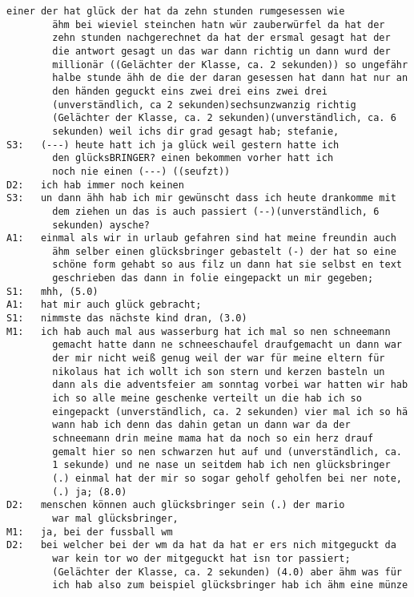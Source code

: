 \begin{lstlisting}[language={}]
        einer der hat glück der hat da zehn stunden rumgesessen wie 
        ähm bei wieviel steinchen hatn wür zauberwürfel da hat der 
        zehn stunden nachgerechnet da hat der ersmal gesagt hat der 
        die antwort gesagt un das war dann richtig un dann wurd der 
        millionär ((Gelächter der Klasse, ca. 2 sekunden)) so ungefähr 
        halbe stunde ähh de die der daran gesessen hat dann hat nur an  
        den händen geguckt eins zwei drei eins zwei drei 
        (unverständlich, ca 2 sekunden)sechsunzwanzig richtig 
        (Gelächter der Klasse, ca. 2 sekunden)(unverständlich, ca. 6 
        sekunden) weil ichs dir grad gesagt hab; stefanie,
S3:   (---) heute hatt ich ja glück weil gestern hatte ich                
        den glücksBRINGER? einen bekommen vorher hatt ich
        noch nie einen (---) ((seufzt))
D2:   ich hab immer noch keinen
S3:   un dann ähh hab ich mir gewünscht dass ich heute drankomme mit  
        dem ziehen un das is auch passiert (--)(unverständlich, 6 
        sekunden) aysche?
A1:   einmal als wir in urlaub gefahren sind hat meine freundin auch 
        ähm selber einen glücksbringer gebastelt (-) der hat so eine 
        schöne form gehabt so aus filz un dann hat sie selbst en text 
        geschrieben das dann in folie eingepackt un mir gegeben;
S1:   mhh, (5.0) 
A1:   hat mir auch glück gebracht;
S1:   nimmste das nächste kind dran, (3.0)
M1:   ich hab auch mal aus wasserburg hat ich mal so nen schneemann 
        gemacht hatte dann ne schneeschaufel draufgemacht un dann war 
        der mir nicht weiß genug weil der war für meine eltern für 
        nikolaus hat ich wollt ich son stern und kerzen basteln un 
        dann als die adventsfeier am sonntag vorbei war hatten wir hab 
        ich so alle meine geschenke verteilt un die hab ich so 
        eingepackt (unverständlich, ca. 2 sekunden) vier mal ich so hä  
        wann hab ich denn das dahin getan un dann war da der 
        schneemann drin meine mama hat da noch so ein herz drauf 
        gemalt hier so nen schwarzen hut auf und (unverständlich, ca. 
        1 sekunde) und ne nase un seitdem hab ich nen glücksbringer 
        (.) einmal hat der mir so sogar geholf geholfen bei ner note, 
        (.) ja; (8.0)
D2:   menschen können auch glücksbringer sein (.) der mario 
        war mal glücksbringer,
M1:   ja, bei der fussball wm
D2:   bei welcher bei der wm da hat da hat er ers nich mitgeguckt da 
        war kein tor wo der mitgeguckt hat isn tor passiert; 
        (Gelächter der Klasse, ca. 2 sekunden) (4.0) aber ähm was für 
        ich hab also zum beispiel glücksbringer hab ich ähm eine münze  

\end{lstlisting}
